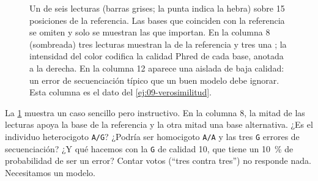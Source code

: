 \begin{figure}[t]
\centering
{}
\caption[Un ]{Un  de seis lecturas (barras grises; la punta indica la hebra) sobre 15 posiciones de la referencia. Las bases que coinciden con la referencia se omiten y solo se muestran las que importan. En la columna 8 (sombreada) tres lecturas muestran la  de la referencia y tres una ; la intensidad del color codifica la calidad Phred de cada base, anotada a la derecha. En la columna 12 aparece una  aislada de baja calidad: un error de secuenciación típico que un buen modelo debe ignorar. Esta columna es el dato del \cref{ej:09-verosimilitud}.}
\label{fig:09-pileup}
\end{figure}

La \cref{fig:09-pileup} muestra un caso sencillo pero instructivo. En la columna 8, la mitad de las lecturas apoya la base de la referencia y la otra mitad una base alternativa. ¿Es el individuo heterocigoto \texttt{A/G}? ¿Podría ser homocigoto \texttt{A/A} y las tres \texttt{G} errores de secuenciación? ¿Y qué hacemos con la \texttt{G} de calidad 10, que tiene un \SI{10}{\percent} de probabilidad de ser un error? Contar votos (``tres contra tres'') no responde nada. Necesitamos un modelo.

